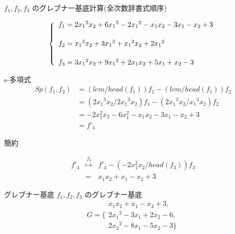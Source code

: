 \begin{frame}
\begin{exampleblock}{$f_1,f_2,f_3$ のグレブナー基底計算(全次数辞書式順序)}

\[ \left\{
\begin{array}{l}
f_1 = 2{x_1}^3x_2 +6{x_1}^3-2{x_1}^2-x_1x_2-3x_1-x_2+3\vspace{.2in}\\
f_2 = {x_1}^3x_2 + 3{x_1}^3 + {x_1}^2x_2 + 2{x_1}^2\vspace{.2in}\\
f_3 = 3{x_1}^2x_2 + 9{x_1}^2 + 2x_1x_2 + 5x_1 + x_2 -3
\end{array}
\right. \]
\end{exampleblock}

\begin{exampleblock}{s-多項式}
\[
\begin{array}{ll} 
Sp(f_1,f_2) &= ( lcm / head(f_1) ) f_1 - ( lcm / head(f_1)) f_2 \\
            &= ( 2{x_1}^3x_2 / 2{x_1}^3x_2 ) f_1 - ( 2{x_1}^3x_2 / {x_1}^3x_2 ) f_2 \\
	    &= -2x_1^2 x_2 -6x_1^2 -x_1 x_2 - 3x_1 -x_2 +3 \\
	    &= f'_4
\end{array}
\]
\end{exampleblock}

\begin{exampleblock}{簡約}

\[
\begin{array}{lll}
f'_4 & \stackrel{f_3}{\longmapsto} & f'_4 - (-2x_1^2 x_2 /{head(f_3)})f_3 \\
     & = & x_1 x_2+ x_1 -x_2 +3
\end{array}
\]
\end{exampleblock}
\end{frame}

\begin{frame}
\begin{exampleblock}{グレブナー基底}
$f_1,f_2,f_3$ のグレブナー基底
\[ 
	G = \{
 \begin{array}{l}
  x_1 x_2 + x_1- x_2 + 3, \\
  2{x_1}^2 - 3 x_1 + 2 x_2 - 6, \\
  2{x_2}^2 - 8 x_1 - 5 x_2 -3 \}
 \end{array} 
\]
\end{exampleblock}
\end{frame}

